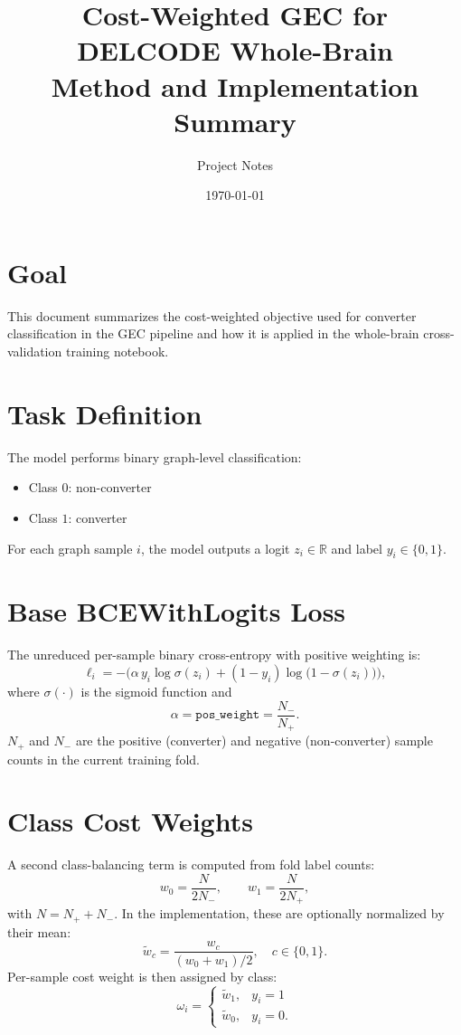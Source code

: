 \documentclass[11pt]{article}
\title{Cost-Weighted GEC for DELCODE Whole-Brain\\Method and Implementation Summary}
\author{Project Notes}
\date{\today}
\begin{document}
\maketitle

\section*{Goal}
This document summarizes the cost-weighted objective used for converter classification in the GEC pipeline and how it is applied in the whole-brain cross-validation training notebook.

\section*{Task Definition}
The model performs binary graph-level classification:
\begin{itemize}
\item Class $0$: non-converter
\item Class $1$: converter
\end{itemize}
For each graph sample $i$, the model outputs a logit $z_i \in \mathbb{R}$ and label $y_i \in \{0,1\}$.

\section*{Base BCEWithLogits Loss}
The unreduced per-sample binary cross-entropy with positive weighting is:
\begin{equation}
\ell_i = -\Big(\alpha\, y_i\log\sigma(z_i) + (1-y_i)\log\big(1-\sigma(z_i)\big)\Big),
\end{equation}
where $\sigma(\cdot)$ is the sigmoid function and
\begin{equation}
\alpha = \texttt{pos\_weight} = \frac{N_{-}}{N_{+}}.
\end{equation}
$N_{+}$ and $N_{-}$ are the positive (converter) and negative (non-converter) sample counts in the current training fold.

\section*{Class Cost Weights}
A second class-balancing term is computed from fold label counts:
\begin{equation}
 w_0 = \frac{N}{2N_{-}}, \qquad w_1 = \frac{N}{2N_{+}},
\end{equation}
with $N = N_{+}+N_{-}$. In the implementation, these are optionally normalized by their mean:
\begin{equation}
\tilde{w}_c = \frac{w_c}{(w_0+w_1)/2}, \quad c\in\{0,1\}.
\end{equation}
Per-sample cost weight is then assigned by class:
\begin{equation}
\omega_i =
\begin{cases}
\tilde{w}_1, & y_i=1 \\
\tilde{w}_0, & y_i=0.
\end{cases}
\end{equation}
\end{document}
